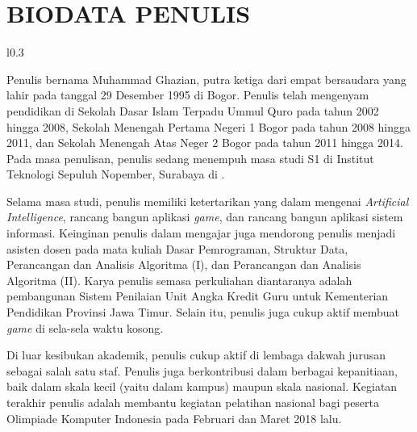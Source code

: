 \chapter{BIODATA PENULIS}

\begin{wrapfigure}{l}{0.3\textwidth}
\end{wrapfigure}

Penulis bernama Muhammad Ghazian, putra ketiga dari empat bersaudara yang lahir pada tanggal 29 Desember 1995 di Bogor. Penulis telah mengenyam pendidikan di Sekolah Dasar Islam Terpadu Ummul Quro pada tahun 2002 hingga 2008, Sekolah Menengah Pertama Negeri 1 Bogor pada tahun 2008 hingga 2011, dan Sekolah Menengah Atas Neger 2 Bogor pada tahun 2011 hingga 2014. Pada masa penulisan, penulis sedang menempuh masa studi S1 di Institut Teknologi Sepuluh Nopember, Surabaya di \jurusan.

Selama masa studi, penulis memiliki ketertarikan yang dalam mengenai \textit{Artificial Intelligence}, rancang bangun aplikasi \textit{game}, dan rancang bangun aplikasi sistem informasi. Keinginan penulis dalam mengajar juga mendorong penulis menjadi asisten dosen pada mata kuliah Dasar Pemrograman, Struktur Data, Perancangan dan Analisis Algoritma (I), dan Perancangan dan Analisis Algoritma (II). Karya penulis semasa perkuliahan diantaranya adalah pembangunan Sistem Penilaian Unit Angka Kredit Guru untuk Kementerian Pendidikan Provinsi Jawa Timur. Selain itu, penulis juga cukup aktif membuat \textit{game} di sela-sela waktu kosong.

Di luar kesibukan akademik, penulis cukup aktif di lembaga dakwah jurusan sebagai salah satu staf. Penulis juga berkontribusi dalam berbagai kepanitiaan, baik dalam skala kecil (yaitu dalam kampus) maupun skala nasional. Kegiatan terakhir penulis adalah membantu kegiatan pelatihan nasional bagi peserta Olimpiade Komputer Indonesia pada Februari dan Maret 2018 lalu.

